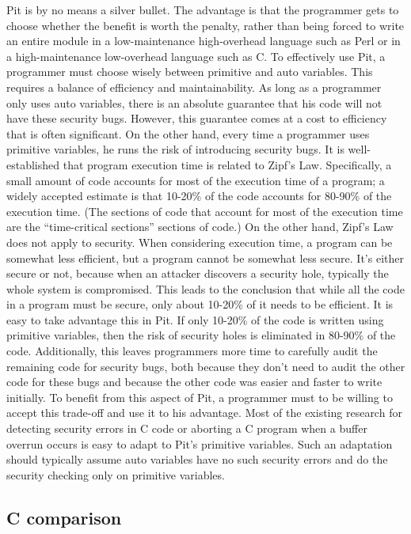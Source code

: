 Pit is by no means a silver bullet.  The advantage is that the programmer gets to choose whether the benefit is
worth the penalty, rather than being forced to write an entire module in a low-maintenance high-overhead language such
as Perl or in a high-maintenance low-overhead language such as C.  To effectively use Pit, a programmer must choose
wisely between primitive and auto variables.  This requires a balance of efficiency and maintainability.  As long as a
programmer only uses auto variables, there is an absolute guarantee that his code will not have these security bugs.
However, this guarantee comes at a cost to efficiency that is often significant.  On the other hand, every time a
programmer uses primitive variables, he runs the risk of introducing security bugs.  It is well-established that
program execution time is related to Zipf's Law.  Specifically, a small amount of code accounts for most of the
execution time of a program; a widely accepted estimate is that 10-20\% of the code accounts for 80-90\% of the
execution time.  (The sections of code that account for most of the execution time are the ``time-critical
sections'' sections of code.)  On the other hand, Zipf's Law does not apply to security.  When considering execution
time, a program can be somewhat less efficient, but a program cannot be somewhat less secure.  It's either secure or
not, because when an attacker discovers a security hole, typically the whole system is compromised.  This leads to the
conclusion that while all the code in a program must be secure, only about 10-20\% of it needs to be efficient.  It is
easy to take advantage this in Pit.  If only 10-20\% of the code is written using primitive variables, then the risk of
security holes is eliminated in 80-90\% of the code.  Additionally, this leaves programmers more time to
carefully audit the remaining code for security bugs, both because they don't need to audit the other code for these
bugs and because the other code was easier and faster to write initially.  To benefit from this aspect of Pit, a
programmer must to be willing to accept this trade-off and use it to his advantage.  Most of the existing research for
detecting security errors in C code or aborting a C program when a buffer overrun occurs is easy to adapt to Pit's
primitive variables.  Such an adaptation should typically assume auto variables have no such security errors and do the
security checking only on primitive variables.

\subsection{C comparison}

